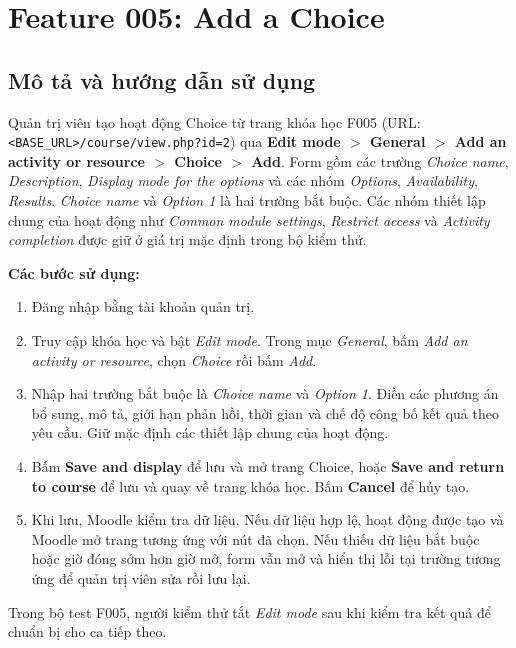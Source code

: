 \section{Feature 005: Add a Choice}
\label{sec:feature005}

\subsection{Mô tả và hướng dẫn sử dụng}
Quản trị viên tạo hoạt động Choice từ trang khóa học F005 (URL: \texttt{\textless{}BASE\_URL\textgreater{}/course/view.php?id=2}) qua \textbf{Edit mode $>$ General $>$ Add an activity or resource $>$ Choice $>$ Add}. Form gồm các trường \textit{Choice name}, \textit{Description}, \textit{Display mode for the options} và các nhóm \textit{Options}, \textit{Availability}, \textit{Results}. \textit{Choice name} và \textit{Option 1} là hai trường bắt buộc. Các nhóm thiết lập chung của hoạt động như \textit{Common module settings}, \textit{Restrict access} và \textit{Activity completion} được giữ ở giá trị mặc định trong bộ kiểm thử.

\textbf{Các bước sử dụng:}
\begin{enumerate}[noitemsep]
  \item Đăng nhập bằng tài khoản quản trị.
  \item Truy cập khóa học và bật \textit{Edit mode}. Trong mục \textit{General}, bấm \textit{Add an activity or resource}, chọn \textit{Choice} rồi bấm \textit{Add}.
  \item Nhập hai trường bắt buộc là \textit{Choice name} và \textit{Option 1}. Điền các phương án bổ sung, mô tả, giới hạn phản hồi, thời gian và chế độ công bố kết quả theo yêu cầu. Giữ mặc định các thiết lập chung của hoạt động.
  \item Bấm \textbf{Save and display} để lưu và mở trang Choice, hoặc \textbf{Save and return to course} để lưu và quay về trang khóa học. Bấm \textbf{Cancel} để hủy tạo.
  \item Khi lưu, Moodle kiểm tra dữ liệu. Nếu dữ liệu hợp lệ, hoạt động được tạo và Moodle mở trang tương ứng với nút đã chọn. Nếu thiếu dữ liệu bắt buộc hoặc giờ đóng sớm hơn giờ mở, form vẫn mở và hiển thị lỗi tại trường tương ứng để quản trị viên sửa rồi lưu lại.
\end{enumerate}
Trong bộ test F005, người kiểm thử tắt \textit{Edit mode} sau khi kiểm tra kết quả để chuẩn bị cho ca tiếp theo.

